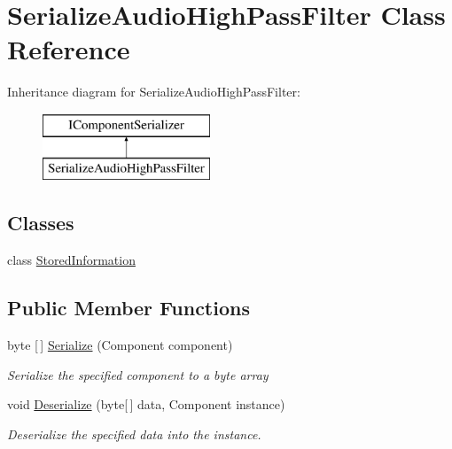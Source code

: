\hypertarget{class_serialize_audio_high_pass_filter}{}\section{Serialize\+Audio\+High\+Pass\+Filter Class Reference}
\label{class_serialize_audio_high_pass_filter}
Inheritance diagram for Serialize\+Audio\+High\+Pass\+Filter\+:\begin{figure}[H]
\begin{center}
\leavevmode
\includegraphics[height=2.000000cm]{class_serialize_audio_high_pass_filter}
\end{center}
\end{figure}
\subsection*{Classes}
\begin{DoxyCompactItemize}
\item 
class \hyperlink{class_serialize_audio_high_pass_filter_1_1_stored_information}{Stored\+Information}
\end{DoxyCompactItemize}
\subsection*{Public Member Functions}
\begin{DoxyCompactItemize}
\item 
byte \mbox{[}$\,$\mbox{]} \hyperlink{class_serialize_audio_high_pass_filter_ae26f6c970a4912689ae3a7300fdc9139}{Serialize} (Component component)
\begin{DoxyCompactList}\small\item\em Serialize the specified component to a byte array \end{DoxyCompactList}\item 
void \hyperlink{class_serialize_audio_high_pass_filter_a12318bb13445fae737731dc3e1d7172b}{Deserialize} (byte\mbox{[}$\,$\mbox{]} data, Component instance)
\begin{DoxyCompactList}\small\item\em Deserialize the specified data into the instance. \end{DoxyCompactList}\end{DoxyCompactItemize}


